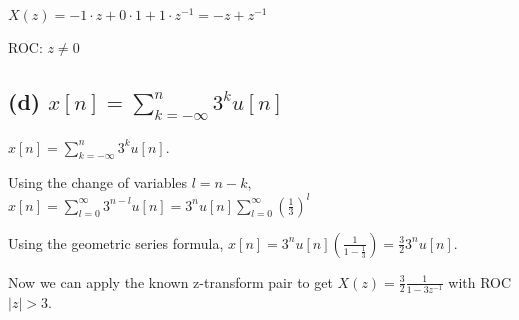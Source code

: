 \documentclass[11pt]{article}
\begin{document}
{\color{blue}
$X(z)=-1\cdot z+0\cdot 1 + 1\cdot z^{-1} = -z+z^{-1}$

ROC: $z \neq 0$
}






%
%

\subsection*{(d) $x[n]= \sum_{k=-\infty}^n3^ku[n]$}

{\color{blue}
$x[n]= \sum_{k=-\infty}^n3^ku[n]$. 

Using the change of variables $l=n-k$, $x[n] = \sum\limits_{l=0}^\infty 3^{n-l}u[n]=3^nu[n]\sum\limits_{l=0}^\infty \left(\frac{1}{3}\right)^l$

Using the geometric series formula, $x[n] = 3^nu[n]\left(\frac{1}{1-\frac{1}{3}}\right) = \frac{3}{2}3^nu[n]$. 

Now we can apply the known z-transform pair to get $X(z) = \frac{3}{2} \frac{1}{1-3z^{-1}}$ with ROC $|z| > 3$.
}
\end{document}

